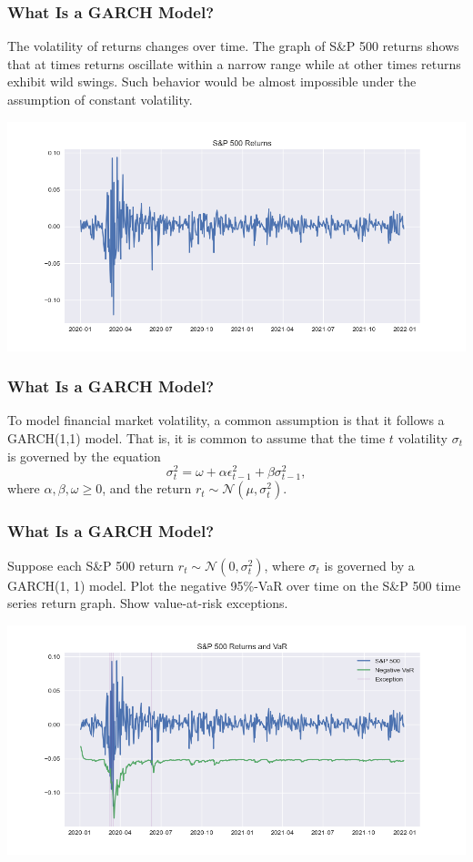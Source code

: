 \documentclass{beamer}
\begin{document}
\begin{frame}
\frametitle{What Is a GARCH Model?}
The volatility of returns changes over time. The graph of S\&P 500 returns shows that at times returns oscillate within a narrow range while at other times returns exhibit wild swings. Such behavior would be almost impossible under the assumption of constant volatility. 
\begin{center}
\includegraphics[scale = 0.4]{spx.png}
\end{center}

\end{frame}

\begin{frame}
\frametitle{What Is a GARCH Model?}
To model financial market volatility, a common assumption is that it follows a GARCH(1,1) model. That is, it is common to assume that the time $t$ volatility $\sigma_t$ is governed by the equation
$$
\sigma_t^2 = \omega + \alpha\epsilon_{t - 1}^2 + \beta\sigma_{t-1}^2,
$$
where $\alpha, \beta, \omega \geq 0$, and the return $ r_t \sim{\mathcal{N}(\mu, \sigma_t^2)}$.
\end{frame}

\begin{frame}

\frametitle{What Is a GARCH Model?}
\begin{example}
Suppose each S\&P 500 return $r_t\sim{\mathcal{N}(0, \sigma_t^2)}$, where $\sigma_t$ is governed by a GARCH(1, 1) model. Plot the negative 95\%-VaR over time on the S\&P 500 time series return graph. Show value-at-risk exceptions.
\end{example}

\begin{solution}
\includegraphics[scale = 0.4]{spx_var.png}
\end{solution}

\end{frame}
\end{document}
